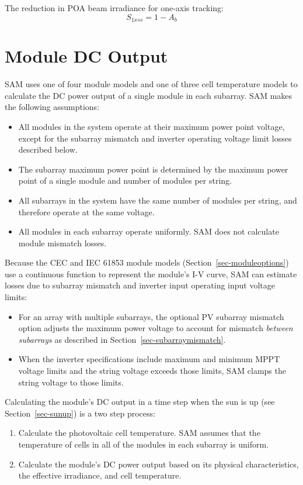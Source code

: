 \documentclass[12pt,letterpaper]{article}
\begin{document}
The reduction in POA beam irradiance for one-axis tracking:
\begin{equation}\label{eqn-ss1x}
S_{1xss} = 1 - A_b
\end{equation}


\chapter{Module DC Output}\label{sec-module}

SAM uses one of four module models and one of three cell temperature models to calculate the DC power output of a single module in each subarray. SAM makes the following assumptions:
\begin{itemize}
\item All modules in the system operate at their maximum power point voltage, except for the subarray mismatch and inverter operating voltage limit losses described below.
\item The subarray maximum power point is determined by the maximum power point of a single module and number of modules per string.
\item All subarrays in the system have the same number of modules per string, and therefore operate at the same voltage.
\item All modules in each subarray operate uniformly. SAM does not calculate module mismatch losses.
\end{itemize}

Because the CEC and IEC 61853 module models (Section~\ref{sec-moduleoptions}) use a continuous function to represent the module's I-V curve, SAM can estimate losses due to subarray mismatch and inverter input operating input voltage limits:
\begin{itemize}
\item For an array with multiple subarrays, the optional PV subarray mismatch option adjusts the maximum power voltage to account for mismatch \textit{between subarrays} as described in Section~\ref{sec-subarraymismatch}.
\item When the inverter specifications include maximum and minimum MPPT voltage limits and the string voltage exceeds those limits, SAM clamps the string voltage to those limits.
\end{itemize}
Calculating the module's DC output in a time step when the sun is up (see Section~\ref{sec-sunup}) is a two step process:
\begin{enumerate}
\item Calculate the photovoltaic cell temperature. SAM assumes that the temperature of cells in all of the modules in each subarray is uniform.
\item Calculate the module's DC power output based on its physical characteristics, the effective irradiance, and cell temperature.
\end{enumerate}
\end{document}
